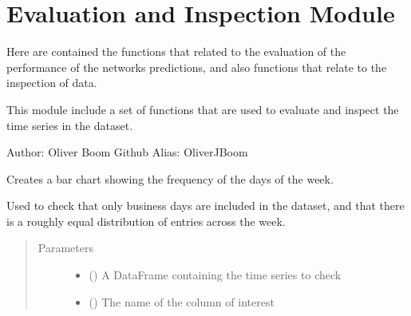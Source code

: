 \documentclass[letterpaper,10pt,english]{sphinxmanual}
\begin{document}
\section{Evaluation and Inspection Module}
\label{\detokenize{eval_inspect:evaluation-and-inspection-module}}\label{\detokenize{eval_inspect::doc}}
Here are contained the functions that related to the evaluation of the performance of the networks predictions, and also functions that relate to the inspection of data.

\label{\detokenize{eval_inspect:module-Foresight.eval_inspect}}
This module include a set of functions that are used to evaluate and
inspect the time series in the dataset.

Author: Oliver Boom
Github Alias: OliverJBoom

\begin{fulllineitems}
\label{\detokenize{eval_inspect:Foresight.eval_inspect.check_day_frequency}}
Creates a bar chart showing the frequency of the days of the week.

Used to check that only business days are included in the dataset, and
that there is a roughly equal distribution of entries across the week.
\begin{quote}\begin{description}
\item[{Parameters}] \leavevmode\begin{itemize}
\item {} 
 () \textendash{} A DataFrame containing the time series to check

\item {} 
 () \textendash{} The name of the column of interest

\end{itemize}

\end{description}\end{quote}

\end{fulllineitems}
\end{document}
